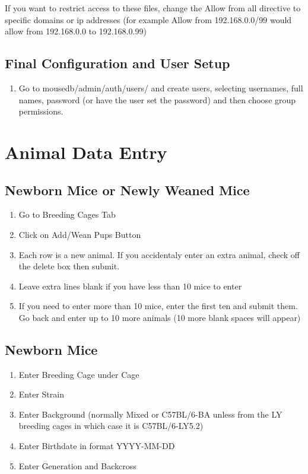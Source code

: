 \documentclass[letterpaper,10pt,english]{sphinxmanual}
\begin{document}
If you want to restrict access to these files, change the Allow from all directive to specific domains or ip addresses (for example Allow from 192.168.0.0/99 would allow from 192.168.0.0 to 192.168.0.99)


\section{Final Configuration and User Setup}
\begin{enumerate}
\item {} 
Go to mousedb/admin/auth/users/ and create users, selecting usernames, full names, password (or have the user set the password) and then choose group permissions.

\end{enumerate}

\resetcurrentobjects
\hypertarget{--doc-usage}{}

\chapter{Animal Data Entry}


\section{Newborn Mice or Newly Weaned Mice}
\begin{enumerate}
\item {} 
Go to Breeding Cages Tab

\item {} 
Click on Add/Wean Pups Button

\item {} 
Each row is a new animal.  If you accidentaly enter an extra animal, check off the delete box then submit.

\item {} 
Leave extra lines blank if you have less than 10 mice to enter

\item {} 
If you need to enter more than 10 mice, enter the first ten and submit them.  Go back and enter up to 10 more animals (10 more blank spaces will appear)

\end{enumerate}


\section{Newborn Mice}
\begin{enumerate}
\item {} 
Enter Breeding Cage under Cage

\item {} 
Enter Strain

\item {} 
Enter Background (normally Mixed or C57BL/6-BA unless from the LY breeding cages in which case it is C57BL/6-LY5.2)

\item {} 
Enter Birthdate in format YYYY-MM-DD

\item {} 
Enter Generation and Backcross

\end{enumerate}
\end{document}
